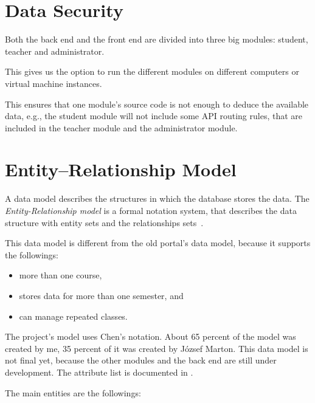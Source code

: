 
 \section{Data Security}
 Both the back end and the front end are divided into three big modules: student, teacher and administrator. 

 This gives us the option to run the different modules on different computers or virtual machine instances.
 
 This ensures that one module's source code is not enough to deduce the available data, e.g., the student module will not include some API routing rules, that are included in the teacher module and the administrator module.
 

\section{Entity–Relationship Model}
\label{ER-model}

A data model describes the structures in which the database stores the data. The \emph{Entity-Relationship model} is a formal notation system, that describes the data structure with entity sets and the relationships sets~\cite{adatb}.

This data model is different from the old portal's data model, because it supports the followings:

\begin{itemize}
	\item more than one course,
	\item stores data for more than one semester, and
	\item can manage repeated classes.
\end{itemize}
 
The project's model uses Chen's notation. About 65 percent of the model was created by me, 35 percent of it was created by József Marton. This data model is not final yet, because the other modules and the back end are still under development. The attribute list is documented in .

The main entities are the followings:

